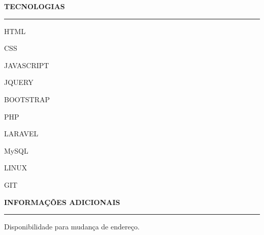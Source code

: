 \documentclass[a4paper,10pt]{article}
\begin{document}
\begin{flushleft}
\textbf{TECNOLOGIAS}
\noindent\textcolor{gray}{\rule{18cm}{1px}}
\end{flushleft}

\begin{itemize}
    \begin{item}
        HTML
    \end{item}
    \begin{item}
        CSS
    \end{item}
    \begin{item}
        JAVASCRIPT
    \end{item}
    \begin{item}
        JQUERY
    \end{item}
    \begin{item}
        BOOTSTRAP
    \end{item}
    \begin{item}
        PHP
    \end{item}
    \begin{item}
        LARAVEL
    \end{item}
    \begin{item}
        MySQL
    \end{item}
    \begin{item}
        LINUX
    \end{item}
    \begin{item}
        GIT
    \end{item}
    \newline
\end{itemize}

\begin{flushleft}
\textbf{INFORMA\c{C}\~{O}ES ADICIONAIS}
\noindent\textcolor{gray}{\rule{18cm}{1px}}
\end{flushleft}

\begin{itemize}
    \begin{item}
        Disponibilidade para mudan\c{c}a de endere\c{c}o.
    \end{item}
\end{itemize}
\end{document}
